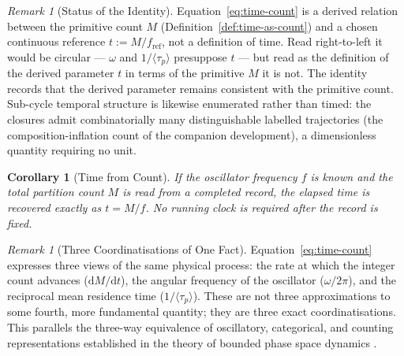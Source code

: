 \documentclass[twocolumn,10pt,a4paper]{article}
\theoremstyle{thmstyle}
\newtheorem{corollary}[theorem]{Corollary}
\theoremstyle{definition}
\theoremstyle{remark}
\newtheorem{remark}[theorem]{Remark}
\newcommand{\tp}{\langle\tau_{p}\rangle}
\newcommand{\dM}{\mathrm{d}M}
\newcommand{\dt}{\mathrm{d}t}
\begin{document}
\begin{remark}[Status of the Identity]
\label{rem:identity-status}
Equation~\eqref{eq:time-count} is a derived relation between the primitive count
$M$ (Definition~\ref{def:time-as-count}) and a chosen continuous reference
$t := M/f_{\mathrm{ref}}$, not a definition of time. Read right-to-left it would
be circular --- $\omega$ and $1/\tp$ presuppose $t$ --- but read as the
definition of the derived parameter $t$ in terms of the primitive $M$ it is not.
The identity records that the derived parameter remains consistent with the
primitive count. Sub-cycle temporal structure is likewise enumerated rather than
timed: the closures admit combinatorially many distinguishable labelled
trajectories (the composition-inflation count of the companion development),
a dimensionless quantity requiring no unit.
\end{remark}

\begin{corollary}[Time from Count]
\label{cor:time-from-count}
If the oscillator frequency $f$ is known and the total partition count $M$ is read from a completed record, the elapsed time is recovered exactly as $t = M/f$. No running clock is required after the record is fixed.
\end{corollary}

\begin{remark}[Three Coordinatisations of One Fact]
Equation~\eqref{eq:time-count} expresses three views of the same physical process: the rate at which the integer count advances ($\dM/\dt$), the angular frequency of the oscillator ($\omega/2\pi$), and the reciprocal mean residence time ($1/\tp$). These are not three approximations to some fourth, more fundamental quantity; they are three exact coordinatisations. This parallels the three-way equivalence of oscillatory, categorical, and counting representations established in the theory of bounded phase space dynamics \citep{arnold1989,birkhoff1931}.
\end{remark}
\end{document}
